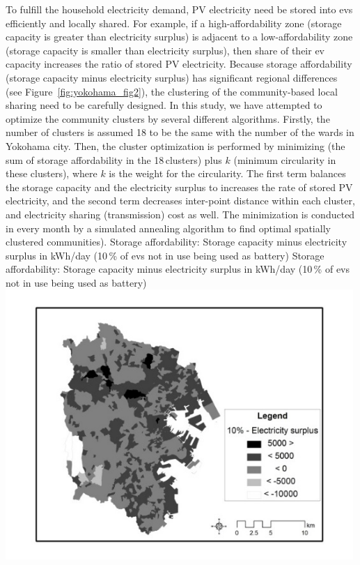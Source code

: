 To fulfill the household electricity demand, PV electricity need be stored into \glspl{ev} efficiently and locally shared. For example, if a high-affordability zone (storage capacity is greater than electricity surplus) is adjacent to a low-affordability zone (storage capacity is smaller than electricity surplus), then share of their \gls{ev} capacity increases the ratio of stored PV electricity. Because storage affordability (storage capacity minus electricity surplus) has significant regional differences (see Figure~\ref{fig:yokohama_fig2}), the clustering of the community-based local sharing need to be carefully designed. In this study, we have attempted to optimize the community clusters by several different algorithms. Firstly, the number of clusters is assumed 18 to be the same with the number of the wards in Yokohama city. Then, the cluster optimization is performed by minimizing (the sum of storage affordability in the 18\,clusters) plus $k$ (minimum circularity in these clusters), where $k$ is the weight for the circularity. The first term balances the storage capacity and the electricity surplus to increases the rate of stored PV electricity, and the second term decreases inter-point distance within each cluster, and electricity sharing (transmission) cost as well. The minimization is conducted in every month by a simulated annealing algorithm to find optimal spatially clustered communities).
%
\createfigure%
{Storage affordability: Storage capacity minus electricity surplus in kWh/day (10\,\% of \glspl{ev} not in use being used as battery)}%
{Storage affordability: Storage capacity minus electricity surplus in kWh/day (10\,\% of \glspl{ev} not in use being used as battery)}%
{\label{fig:yokohama_fig2}}%
{\includegraphics[width=0.99\textwidth, angle=0]{./scenarios/figures/yokohama_fig2.png}}%
